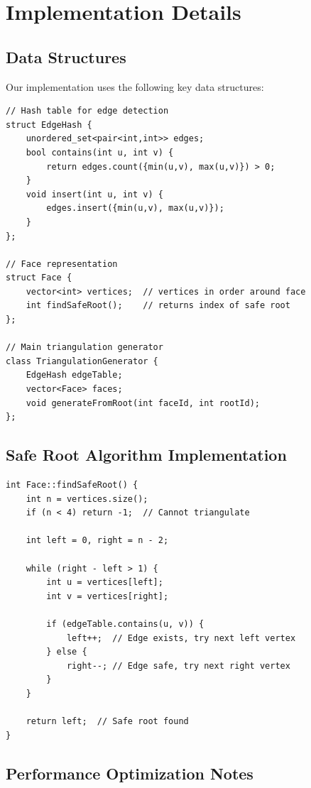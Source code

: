 \documentclass[12pt,a4paper]{article}
\begin{document}
\appendix

\section{Implementation Details}

\subsection{Data Structures}

Our implementation uses the following key data structures:

\begin{verbatim}
// Hash table for edge detection
struct EdgeHash {
    unordered_set<pair<int,int>> edges;
    bool contains(int u, int v) { 
        return edges.count({min(u,v), max(u,v)}) > 0; 
    }
    void insert(int u, int v) { 
        edges.insert({min(u,v), max(u,v)}); 
    }
};

// Face representation
struct Face {
    vector<int> vertices;  // vertices in order around face
    int findSafeRoot();    // returns index of safe root
};

// Main triangulation generator
class TriangulationGenerator {
    EdgeHash edgeTable;
    vector<Face> faces;
    void generateFromRoot(int faceId, int rootId);
};
\end{verbatim}

\subsection{Safe Root Algorithm Implementation}

\begin{verbatim}
int Face::findSafeRoot() {
    int n = vertices.size();
    if (n < 4) return -1;  // Cannot triangulate
    
    int left = 0, right = n - 2;
    
    while (right - left > 1) {
        int u = vertices[left];
        int v = vertices[right];
        
        if (edgeTable.contains(u, v)) {
            left++;  // Edge exists, try next left vertex
        } else {
            right--; // Edge safe, try next right vertex  
        }
    }
    
    return left;  // Safe root found
}
\end{verbatim}

\subsection{Performance Optimization Notes}
\end{document}
